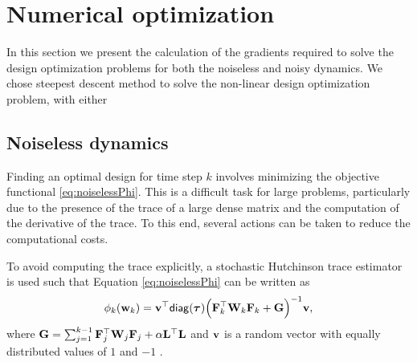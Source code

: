 \documentclass[11pt]{article}
\newcommand{\bfF}	{{\bf{F}}}
\newcommand{\bfG}	{{\bf{G}}}
\newcommand{\bfL}	{{\bf{L}}}
\newcommand{\bfW}	{{\bf{W}}}
\newcommand{\bfv}	{{\bf{v}}}
\newcommand{\bfw}	{{\bf{w}}}
\newcommand{\bftau}      {{\boldsymbol \tau}}
\newcommand{\LtL}       { \bfL^{\top}\bfL}
\begin{document}
\section{Numerical optimization}
In this section we present the calculation of the gradients required to solve the design optimization problems for both the noiseless and noisy dynamics. We chose steepest descent method to solve the non-linear design optimization problem, with either 
\label{sec:Opt}
\subsection{Noiseless dynamics}
Finding an optimal design for  time step $k$ involves minimizing the objective functional \eqref{eq:noiselessPhi}. 
This is a difficult task for large problems, particularly due to the presence of the trace of a large dense matrix and the computation of the derivative of the trace. To this end, several actions can be taken to reduce the computational costs.

To avoid computing the trace explicitly, a stochastic Hutchinson trace estimator  is used  such that Equation \eqref{eq:noiselessPhi} can be written as
\begin{equation*}
\phi_k(\bfw_k) = \bfv^{\top}{\sf diag}(\bftau) \Big(\bfF_k^{\top}\bfW_k\bfF_k   + \bfG \Big)^{-1}\bfv,
\end{equation*}
where $\bfG = \sum_{j=1}^{k-1}\bfF_{j}^{\top}\bfW_{j}\bfF_{j}+ \alpha\LtL$ and $\bfv$ is a random vector with equally distributed values of $1$ and $-1$ \cite{Hutchinson1989}. 
\end{document}

